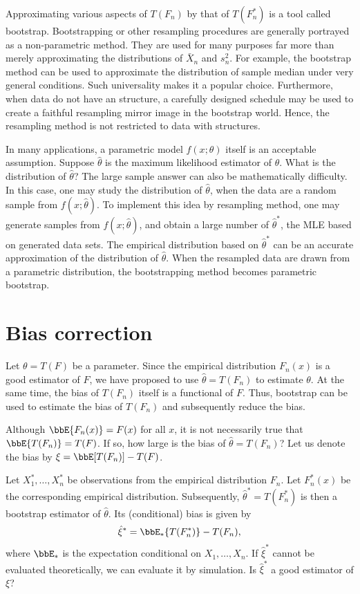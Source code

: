 Approximating various aspects of $T(F_n)$ by that
of $T(F_n^*)$ is a tool called bootstrap.
Bootstrapping or other resampling procedures
are generally portrayed as a non-parametric method. 
They are used for many purposes far more than merely  
approximating the distributions of $\bar X_n$
and $s_n^2$.  For example, the bootstrap method can be
used to approximate the distribution of sample median under
very general conditions. Such universality makes it a popular choice. 
Furthermore, when data do not have an \iid structure, a
carefully designed schedule may be used to
create a faithful resampling mirror image in the bootstrap world.
Hence, the resampling method is not restricted to data with
\iid structures.

In many applications, a parametric model
$f(x; \theta)$ itself is an acceptable assumption. 
Suppose $\hat \theta$ is the maximum likelihood
estimator of $\theta$. What is the distribution of $\hat \theta$?
The large sample answer can also be mathematically difficulty.
In this case,
one may study the distribution of $\hat \theta$, when
the data are a random sample from $f(x; \hat \theta)$. To implement
this idea by resampling method, one may generate samples
from $f(x; \hat \theta)$, and obtain a large number of
$\hat \theta^*$, the MLE based on generated data sets.
The empirical distribution based on $\hat \theta^*$
can be an accurate approximation of the distribution of $\hat \theta$.
When the resampled data are drawn from a parametric
distribution, the bootstrapping method becomes parametric 
bootstrap.

\section{Bias correction}

Let $\theta = T(F)$ be a parameter.  Since the empirical distribution 
$F_n(x)$ is a good estimator of $F$, we have proposed to use
$\hat \theta = T(F_n)$ to estimate $\theta$.
At the same time, the bias of $T(F_n)$ itself is a
functional of $F$. Thus, bootstrap can be used
to estimate the bias of $T(F_n)$ and 
subsequently reduce the bias.

Although $\bbE\{F_n(x)\} = F(x)$ for all $x$, it is not necessarily
true that $\bbE\{T(F_n)\} = T(F)$. If so, how large is the bias of
$\hat \theta = T(F_n)$? Let us denote the bias
by $\xi = \bbE[T(F_n)] - T(F)$.

Let $X_1^*, \ldots, X_n^*$
be \iid observations from the empirical distribution $F_n$.
Let $F_n^*(x)$ be the corresponding empirical distribution. 
Subsequently,
$\hat \theta^* = T(F_n^*)$ is then a bootstrap estimator of
$\hat \theta$. 
Its (conditional) bias is given by
\[    
\hat \xi^* = \bbE_* \{T(F_n^*)\} - T(F_n), 
\]
where $\bbE_*$ is the expectation conditional on $X_1, \ldots, X_n$.
If $\hat \xi^*$ cannot be evaluated theoretically,
we can evaluate it by simulation. Is $\hat \xi^*$ a good
estimator of $\xi$?


